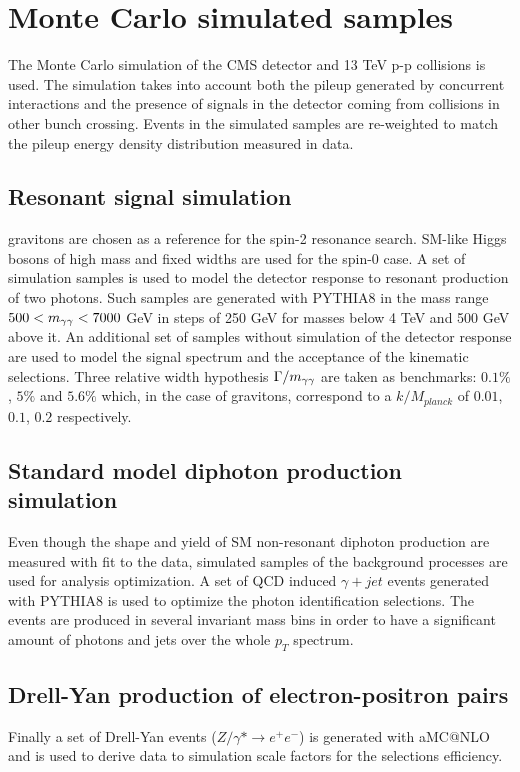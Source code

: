 \section{Monte Carlo simulated samples}
The Monte Carlo simulation of the CMS detector and 13 TeV p-p collisions is used. The simulation
takes into account both the pileup generated by concurrent interactions and the presence of
signals in the detector coming from collisions in other bunch crossing. Events in the simulated samples
are re-weighted to match the pileup energy density distribution measured in data.

\subsection{Resonant signal simulation}
\RS gravitons are chosen as a reference for the spin-2 resonance search. SM-like Higgs bosons of high mass and
fixed widths are used for the spin-0 case.
A set of simulation samples is used to model the detector response to resonant production of two photons.
Such samples are generated with PYTHIA8 in the mass range $500 < m_{\gamma\gamma} < 7000$ GeV in steps of 250 GeV for
masses below 4 TeV and 500 GeV above it. An additional set of samples without simulation of the detector
response are used to model the signal spectrum and the acceptance of the kinematic selections.
Three relative width hypothesis $\Gamma/m_{\gamma\gamma}$ are taken as benchmarks: $0.1\%$, $5\%$ and $5.6\%$ which,
in the case of \RS gravitons, correspond to a $k/M_{planck}$ of $0.01$, $0.1$, $0.2$ respectively.

\subsection{Standard model diphoton production simulation}
Even though the shape and yield of SM non-resonant diphoton production are measured with fit to the data,
simulated samples of the background processes are used for analysis optimization. A set of QCD induced
$\gamma+jet$ events generated with PYTHIA8 is used to optimize the photon identification selections.
The events are produced in several invariant mass bins in order to have a significant amount of photons and
jets over the whole $p_T$ spectrum.

\subsection{Drell-Yan production of electron-positron pairs}
Finally a set of Drell-Yan events ($Z/\gamma* \to e^{+}e^{-}$) is generated with aMC@NLO and is
used to derive data to simulation scale factors for the selections efficiency.




